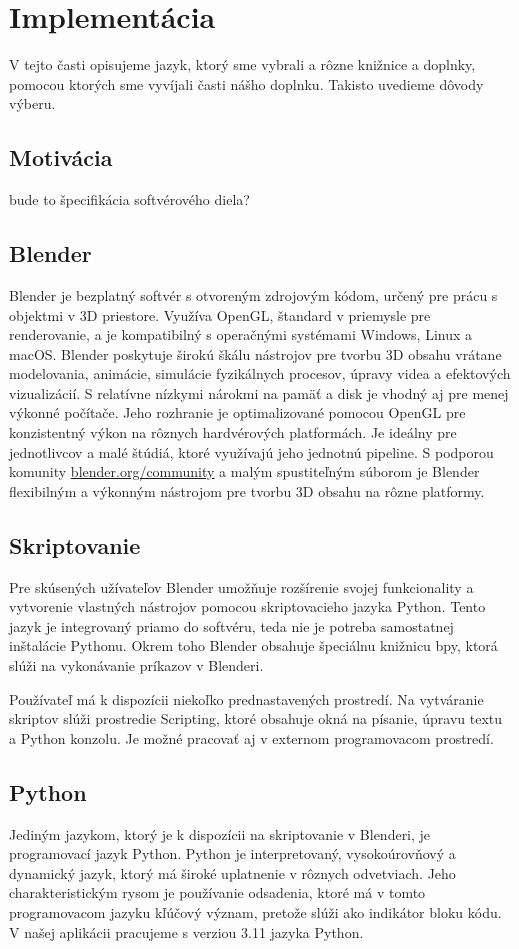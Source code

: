 \chapter{Implementácia}
V tejto časti opisujeme jazyk, ktorý sme vybrali a rôzne knižnice a doplnky, pomocou
ktorých sme vyvíjali časti nášho doplnku. Takisto uvedieme dôvody výberu.
\section{Motivácia}
bude to špecifikácia softvérového diela?
\section{Blender}
Blender je bezplatný softvér s otvoreným zdrojovým kódom, určený pre prácu s objektmi v 3D priestore. Využíva OpenGL, štandard v priemysle pre renderovanie, a je kompatibilný s operačnými systémami Windows, Linux a macOS. 
Blender poskytuje širokú škálu nástrojov pre tvorbu 3D obsahu vrátane modelovania, animácie, simulácie fyzikálnych procesov, úpravy videa a efektových vizualizácií. S relatívne nízkymi nárokmi na pamäť a disk je vhodný aj pre menej výkonné počítače. Jeho rozhranie je optimalizované pomocou OpenGL pre konzistentný výkon na rôznych hardvérových platformách. Je ideálny pre jednotlivcov a malé štúdiá, ktoré využívajú jeho jednotnú pipeline. S podporou komunity \url{blender.org/community} a malým spustiteľným súborom je Blender flexibilným a výkonným nástrojom pre tvorbu 3D obsahu na rôzne platformy. \cite{Blender}
\section{Skriptovanie}
Pre skúsených užívateľov Blender umožňuje rozšírenie svojej funkcionality a vytvorenie vlastných nástrojov pomocou skriptovacieho jazyka Python. Tento jazyk je integrovaný priamo do softvéru, teda nie je potreba samostatnej inštalácie Pythonu. Okrem toho Blender obsahuje špeciálnu knižnicu bpy, ktorá slúži na vykonávanie príkazov v Blenderi.

Používateľ má k dispozícii niekoľko prednastavených prostredí. Na vytváranie skriptov slúži prostredie Scripting, ktoré obsahuje okná na písanie, úpravu textu a Python konzolu. Je možné pracovať aj v externom programovacom prostredí.\cite{BlenderAPI}
\section{Python}
Jediným jazykom, ktorý je k dispozícii na skriptovanie v Blenderi, je programovací jazyk Python. Python je interpretovaný, vysokoúrovňový a dynamický jazyk, ktorý má široké uplatnenie v rôznych odvetviach. Jeho charakteristickým rysom je používanie odsadenia, ktoré má v tomto programovacom jazyku kľúčový význam, pretože slúži ako indikátor bloku kódu. V našej aplikácii pracujeme s verziou 3.11 jazyka Python.
